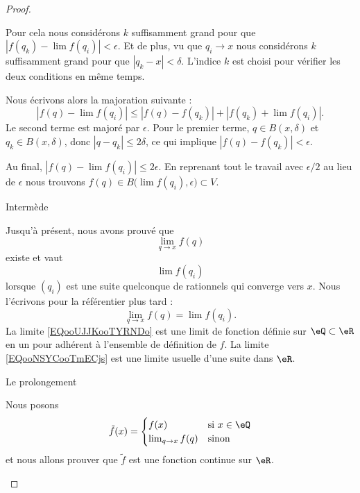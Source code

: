 \begin{proof}
\begin{subproof}
		Pour cela nous considérons \( k\) suffisamment grand pour que \( | f(q_k)-\lim f(q_i)  |<\epsilon\). Et de plus, vu que \( q_i\to x\) nous considérons \( k\) suffisamment grand pour que \( | q_k-x |<\delta\). L'indice \( k\) est choisi pour vérifier les deux conditions en même temps.

		Nous écrivons alors la majoration suivante :
		\begin{equation}
			| f(q)-\lim f(q_i) |\leq | f(q)-f(q_k) |+| f(q_k)+\lim f(q_i) |.
		\end{equation}
		Le second terme est majoré par \( \epsilon\). Pour le premier terme, \( q\in B(x,\delta)\) et \( q_k\in B(x,\delta)\), donc \( | q-q_k |\leq 2\delta\), ce qui implique \( | f(q)-f(q_k) |<\epsilon\).

		Au final, \( | f(q)-\lim f(q_i) |\leq 2\epsilon\). En reprenant tout le travail avec \( \epsilon/2\) au lieu de \( \epsilon\) nous trouvons \( f(q)\in B\big( \lim f(q_i),\epsilon \big)\subset V\).

		\item[Intermède]

		Jusqu'à présent, nous avons prouvé que
		\begin{equation}        \label{EQooUJJKooTYRNDo}
			\lim_{q\to x} f(q)
		\end{equation}
		existe et vaut
		\begin{equation}        \label{EQooNSYCooTmECjs}
			\lim f(q_i)
		\end{equation}
		lorsque \( (q_{i})\) est une suite quelconque de rationnels qui converge vers \( x\). Nous l'écrivons pour la référentier plus tard :
		\begin{equation}        \label{EQooSGCMooKtpVMy}
			\lim_{q\to x} f(q)=\lim f(q_i).
		\end{equation}
		La limite \eqref{EQooUJJKooTYRNDo} est une limit de fonction définie sur \( \eQ\subset \eR\) en un pour adhérent à l'ensemble de définition de \( f\). La limite \eqref{EQooNSYCooTmECjs} est une limite usuelle d'une suite dans \( \eR\).

		\item[Le prolongement]

		Nous posons
		\begin{equation}
			\tilde f(x)=\begin{cases}
				f(x)               & \text{si } x\in \eQ \\
				\lim_{q\to x} f(q) & \text{sinon }
			\end{cases}
		\end{equation}
		et nous allons prouver que \( \tilde f\) est une fonction continue sur \( \eR\).


\end{subproof}
\end{proof}

